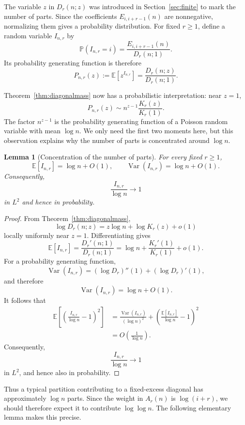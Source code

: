 \documentclass[11pt]{article}
\newtheorem{lemma}[theorem]{Lemma}
\theoremstyle{definition}
\begin{document}
The variable $z$ in $D_r(n;z)$ was introduced in Section~\ref{sec:finite}
to mark the number of parts.  Since the coefficients
$E_{i,i+r-1}(n)$ are nonnegative, normalizing them gives a probability
distribution.  For fixed $r\geq1$, define a random variable
$I_{n,r}$ by
\[
 \mathbb P(I_{n,r}=i)
 =
 \frac{E_{i,i+r-1}(n)}
 {D_r(n;1)}.
\]
Its probability generating function is therefore
\begin{equation}\label{eq:Pnr}
 P_{n,r}(z)
 :=
 \mathbb E[z^{I_{n,r}}]
 =
 \frac{D_r(n;z)}{D_r(n;1)}.
\end{equation}

Theorem~\ref{thm:diagonalmass} now has a probabilistic interpretation:
near $z=1$,
\[
 P_{n,r}(z)
 \sim
 n^{z-1}\frac{K_r(z)}{K_r(1)}.
\]
The factor $n^{z-1}$ is the probability generating function of a
Poisson random variable with mean $\log n$.  We only need the first
two moments here, but this observation explains why the number of
parts is concentrated around $\log n$.

\begin{lemma}[Concentration of the number of parts]
\label{lem:concentration}
For every fixed $r\geq1$,
\[
 \mathbb E[I_{n,r}]
 =
 \log n+O(1),
 \qquad
 \operatorname{Var}(I_{n,r})
 =
 \log n+O(1).
\]
Consequently,
\[
        \frac{I_{n,r}}{\log n}
        \longrightarrow1
\]
in $L^2$ and hence in probability.
\end{lemma}

\begin{proof}
From Theorem~\ref{thm:diagonalmass},
\[
 \log D_r(n;z)
 =
 z\log n+\log K_r(z)+o(1)
\]
locally uniformly near $z=1$.  Differentiating gives
\[
 \mathbb E[I_{n,r}]
 =
 \frac{D_r'(n;1)}{D_r(n;1)}
 =
 \log n+\frac{K_r'(1)}{K_r(1)}+o(1).
\]
For a probability generating function,
\[
 \operatorname{Var}(I_{n,r})
 =
 (\log D_r)''(1)+(\log D_r)'(1),
\]
and therefore
\[
        \operatorname{Var}(I_{n,r})
        =
        \log n+O(1).
\]
It follows that
\begin{align*}
\mathbb E\left[
\left(
\frac{I_{n,r}}{\log n}-1
\right)^2
\right]
&=
\frac{\operatorname{Var}(I_{n,r})}{(\log n)^2}
+
\left(
\frac{\mathbb E[I_{n,r}]}{\log n}-1
\right)^2\\
&=
O\left(\frac{1}{\log n}\right).
\end{align*}
Consequently,
\[
        \frac{I_{n,r}}{\log n}
        \longrightarrow 1
\]
in $L^2$, and hence also in probability.
\end{proof}

Thus a typical partition contributing to a fixed-excess diagonal has
approximately $\log n$ parts.  Since the weight in $A_r(n)$ is
$\log(i+r)$, we should therefore expect it to contribute
$\log\log n$.  The following elementary lemma makes this precise.
\end{document}
